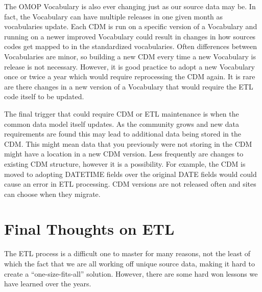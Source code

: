 \documentclass[11pt]{book}
\theoremstyle{definition}
\theoremstyle{definition}
\theoremstyle{definition}
\theoremstyle{remark}
\begin{document}
The OMOP Vocabulary is also ever changing just as our source data may
be. In fact, the Vocabulary can have multiple releases in one given
month as vocabularies update. Each CDM is run on a specific version of a
Vocabulary and running on a newer improved Vocabulary could result in
changes in how sources codes get mapped to in the standardized
vocabularies. Often differences between Vocabularies are minor, so
building a new CDM every time a new Vocabulary is release is not
necessary. However, it is good practice to adopt a new Vocabulary once
or twice a year which would require reprocessing the CDM again. It is
rare are there changes in a new version of a Vocabulary that would
require the ETL code itself to be updated.

The final trigger that could require CDM or ETL maintenance is when the
common data model itself updates. As the community grows and new data
requirements are found this may lead to additional data being stored in
the CDM. This might mean data that you previously were not storing in
the CDM might have a location in a new CDM version. Less frequently are
changes to existing CDM structure, however it is a possibility. For
example, the CDM is moved to adopting DATETIME fields over the original
DATE fields would could cause an error in ETL processing. CDM versions
are not released often and sites can choose when they migrate.

\section{Final Thoughts on ETL}\label{final-thoughts-on-etl}

The ETL process is a difficult one to master for many reasons, not the
least of which the fact that we are all working off unique source data,
making it hard to create a ``one-size-fits-all'' solution. However,
there are some hard won lessons we have learned over the years.
\end{document}
